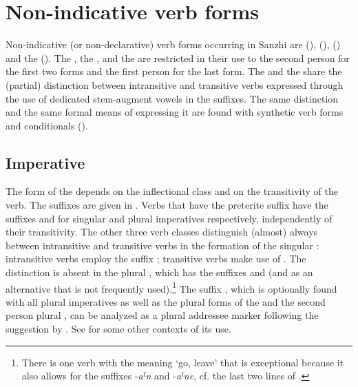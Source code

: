 \chapter{Non-indicative verb forms}\label{cpt:verbs-nondeclarative}
\largerpage

Non-indicative (or non-declarative) verb forms occurring in Sanzhi are  (),  (),  () and the  (). The , the , and the  are restricted in their use to the second person for the first two forms and the first person for the last form. The  and the  share the (partial) distinction between intransitive and transitive verbs expressed through the use of dedicated stem-augment vowels in the suffixes. The same distinction and the same formal means of expressing it are found with synthetic verb forms and conditionals ().



\section{Imperative}
\label{sec:imperative}

The form of the  depends on the inflectional class and on the transitivity of the verb. The suffixes are given in . Verbs that have the preterite suffix  have the suffixes  and  for singular and plural imperatives respectively, independently of their transitivity. The other three verb classes distinguish (almost) always between intransitive and transitive verbs in the formation of the singular : intransitive verbs employ the suffix ; transitive verbs make use of . The distinction is absent in the plural , which has the suffixes and  (and  as an alternative that is not frequently used).\footnote{There is one verb with the meaning `go, leave' that is exceptional because it also allows for the suffixes -\textit{aˁn} and -\textit{aˁne}, cf. the last two lines of .} The suffix , which is optionally found with all plural imperatives as well as the plural forms of the  and the second person plural , can be analyzed as a plural addressee marker following the suggestion by \citet[163]{Sumbatova.Lander2014}. See  for some other contexts of its use.


